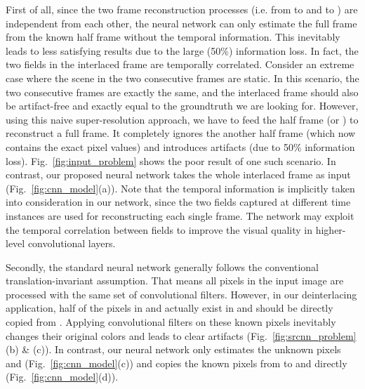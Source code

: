 \documentclass[acmtog]{acmart}
\begin{document}
First of all, since the two frame reconstruction processes (i.e. from
 to  and
 to ) are independent from
each other, the neural network can only estimate the full frame from the known
half frame without the temporal information. This inevitably leads to less
satisfying results due to the large (50\%) information loss. In fact, the two
fields in the interlaced frame are temporally correlated. Consider an extreme
case where the scene in the two consecutive frames are static. In this scenario,
the two consecutive frames are exactly the same, and the interlaced frame should
also be artifact-free and exactly equal to the groundtruth we are looking for.
However, using this naive super-resolution approach, we have to feed the half
frame  (or ) to
reconstruct a full frame. It completely ignores the another half frame (which
now contains the exact pixel values) and introduces artifacts (due to 50\%
information loss). Fig.~\ref{fig:input_problem} shows the  poor result of one
such scenario. In contrast, our proposed neural network takes the whole
interlaced frame  as input (Fig.~\ref{fig:cnn_model}(a)). Note that
the temporal information is implicitly taken into consideration in our network,
since the two fields captured at different time instances are used for reconstructing each
single frame. The network may exploit the temporal correlation between fields to
improve the visual quality in higher-level convolutional layers.

Secondly, the standard neural network generally follows the conventional
translation-invariant assumption. That means all pixels in the input image are
processed with the same set of convolutional filters. However, in our deinterlacing
application, half of the pixels in  and  actually 
exist in  and should be directly copied from . 
Applying convolutional filters on these
known pixels inevitably changes their original colors and leads to clear
artifacts (Fig.~\ref{fig:srcnn_problem}(b) \& (c)). In contrast, our neural network only
estimates the unknown pixels  and
 (Fig.~\ref{fig:cnn_model}(c)) and copies the known
pixels from  to  and  directly
(Fig.~\ref{fig:cnn_model}(d)).
\end{document}
